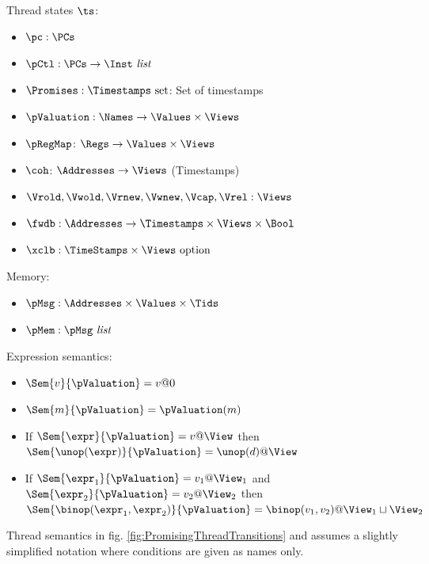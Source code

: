 Thread states $\ts$:
\begin{itemize}
\item $\pc:\PCs$
\item $\pCtl:\PCs\rightarrow \Inst\ \mathit{list}$
\item $\Promises: \Timestamps\ \mbox{set}$: Set of timestamps
\item $\pValuation:\Names\rightarrow \Values\times\Views$
\item $\pRegMap$: $\Regs \rightarrow \Values \times \Views$
\item $\coh$: $\Addresses \rightarrow \Views$ (Timestamps)
\item $\Vrold,\Vwold,\Vrnew,\Vwnew,\Vcap, \Vrel:\Views$
\item $\fwdb: \Addresses \rightarrow \Timestamps \times \Views \times \Bool$
\item $\xclb: \TimeStamps \times \Views\ \mbox{option}$
\end{itemize}

Memory:
\begin{itemize}
\item $\pMsg: \Addresses\times\Values\times\Tids$
\item $\pMem: \pMsg\ \mathit{list}$
\end{itemize}

Expression semantics:
\begin{itemize}
\item $\Sem{v}{\pValuation} = v@0$
\item $\Sem{m}{\pValuation} = \pValuation(m)$
\item If $\Sem{\expr}{\pValuation} = v@\View$ then $\Sem{\unop(\expr)}{\pValuation} = \unop(d)@\View$
\item If $\Sem{\expr_1}{\pValuation} = v_1@\View_1$ and $\Sem{\expr_2}{\pValuation} = v_2@\View_2$ then $\Sem{\binop(\expr_1,\expr_2)}{\pValuation} = \binop(v_1,v_2)@\View_1\sqcup\View_2$
\end{itemize}

Thread semantics in fig. \ref{fig:PromisingThreadTransitions} and assumes a slightly simplified notation where conditions are given as names only.  

